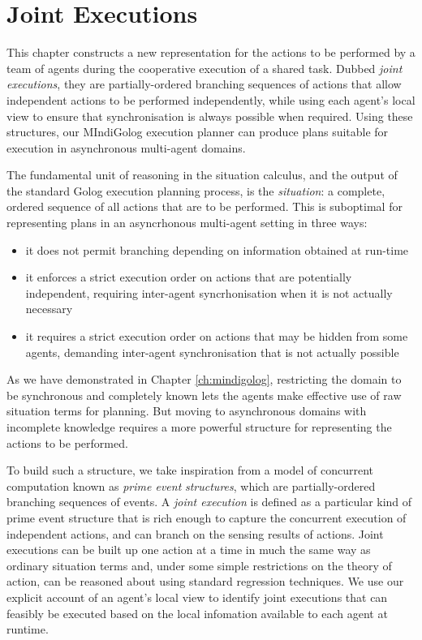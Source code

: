 

\chapter{Joint Executions}

\label{ch:jointexec}

This chapter constructs a new representation for the actions to be
performed by a team of agents during the cooperative execution of
a shared task. Dubbed \emph{joint executions}, they are partially-ordered
branching sequences of actions that allow independent actions to be
performed independently, while using each agent's local view to ensure
that synchronisation is always possible when required. Using these
structures, our MIndiGolog execution planner can produce plans suitable
for execution in asynchronous multi-agent domains.

The fundamental unit of reasoning in the situation calculus, and the
output of the standard Golog execution planning process, is the \emph{situation}:
a complete, ordered sequence of all actions that are to be performed.
This is suboptimal for representing plans in an asyncrhonous multi-agent
setting in three ways:

\begin{itemize}
\item it does not permit branching depending on information obtained at
run-time 
\item it enforces a strict execution order on actions that are potentially
independent, requiring inter-agent syncrhonisation when it is not
actually necessary 
\item it requires a strict execution order on actions that may be hidden
from some agents, demanding inter-agent synchronisation that is not
actually possible 
\end{itemize}
As we have demonstrated in Chapter \ref{ch:mindigolog}, restricting
the domain to be synchronous and completely known lets the agents
make effective use of raw situation terms for planning. But moving
to asynchronous domains with incomplete knowledge requires a more
powerful structure for representing the actions to be performed.

To build such a structure, we take inspiration from a model of concurrent
computation known as \emph{prime event} \emph{structures}, which are
partially-ordered branching sequences of events. A \emph{joint execution}
is defined as a particular kind of prime event structure that is rich
enough to capture the concurrent execution of independent actions,
and can branch on the sensing results of actions. Joint executions
can be built up one action at a time in much the same way as ordinary
situation terms and, under some simple restrictions on the theory
of action, can be reasoned about using standard regression techniques.
We use our explicit account of an agent's local view to identify joint
executions that can feasibly be executed based on the local infomation
available to each agent at runtime.

